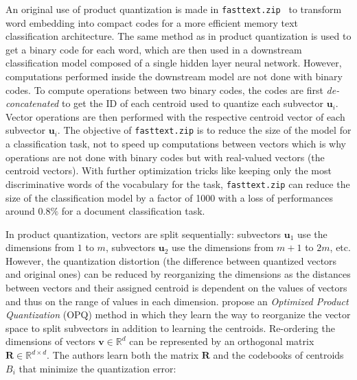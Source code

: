     An original use of product quantization is made in
    \texttt{fasttext.zip}~\citep{joulin2016fasttext} to transform word embedding
    into compact codes for a more efficient memory text classification
    architecture. The same method as in product quantization is used to get a
    binary code for each word, which are then used in a downstream
    classification model composed of a single hidden layer neural network.
    However, computations performed inside the downstream model are not done
    with binary codes. To compute operations between two binary codes, the codes
    are first \textit{de-concatenated} to get the ID of each centroid used to
    quantize each subvector $\mathbf{u}_i$. Vector operations are then performed
    with the respective centroid vector of each subvector $\mathbf{u}_i$. The
    objective of \texttt{fasttext.zip} is to reduce the size of the model for a
    classification task, not to speed up computations between vectors which is
    why operations are not done with binary codes but with real-valued vectors
    (the centroid vectors). With further optimization tricks like keeping only
    the most discriminative words of the vocabulary for the task,
    \texttt{fasttext.zip} can reduce the size of the classification model by a
    factor of 1000 with a loss of performances around $0.8\%$ for a document
    classification task.\medskip

    In product quantization, vectors are split sequentially: subvectors
    $\mathbf{u}_1$ use the dimensions from $1$ to $m$, subvectors $\mathbf{u}_2$
    use the dimensions from $m+1$ to $2m$, etc. However, the quantization
    distortion (the difference between quantized vectors and original ones) can
    be reduced by reorganizing the dimensions as the distances between vectors
    and their assigned centroid is dependent on the values of vectors and thus
    on the range of values in each dimension. \citeauthor{ge2013optimized}
    \citep{ge2013optimized} propose an \textit{Optimized Product Quantization}
    (OPQ) method in which they learn the way to reorganize the vector space to
    split subvectors in addition to learning the centroids. Re-ordering the
    dimensions of vectors $\mathbf{v} \in \mathbb{R}^d$ can be represented by an
    orthogonal matrix $\mathbf{R} \in \mathbb{R}^{d \times d}$. The authors
    learn both the matrix $\mathbf{R}$ and the codebooks of centroids $B_i$ that
    minimize the quantization error:

